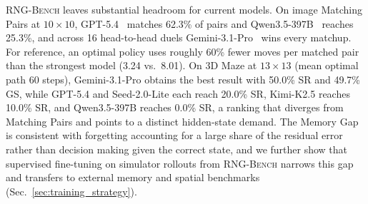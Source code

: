 \documentclass{llmxive}
\providecommand{\benchname}{\textsc{RNG-Bench}\xspace}
\begin{document}

\benchname{} leaves substantial headroom for current models. On image Matching Pairs at $10{\times}10$, GPT-5.4~\cite{gpt5.4} matches 62.3\% of pairs and Qwen3.5-397B~\cite{qwen3.5} reaches 25.3\%, and across 16 head-to-head duels Gemini-3.1-Pro~\citep{gemini3.1pro} wins every matchup. For reference, an optimal policy uses roughly 60\% fewer moves per matched pair than the strongest model (3.24 vs.\ 8.01).
On 3D Maze at $13{\times}13$ (mean optimal path 60 steps), Gemini-3.1-Pro obtains the best result with 50.0\% SR and 49.7\% GS, while GPT-5.4 and Seed-2.0-Lite each reach 20.0\% SR, Kimi-K2.5 reaches 10.0\% SR, and Qwen3.5-397B reaches 0.0\% SR, a ranking that diverges from Matching Pairs and points to a distinct hidden-state demand.
The Memory Gap is consistent with forgetting accounting for a large share of the residual error rather than decision making given the correct state, and we further show that supervised fine-tuning on simulator rollouts from \benchname{} narrows this gap and transfers to external memory and spatial benchmarks (Sec.~\ref{sec:training_strategy}).
\end{document}
